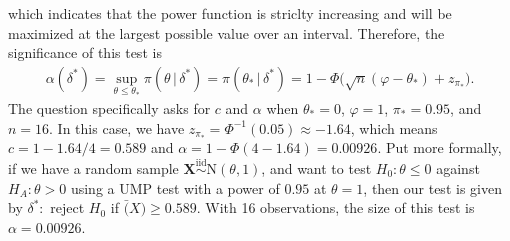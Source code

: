 \documentclass[10pt]{article}
\begin{document}
which indicates that the power function is striclty increasing and will be maximized at the largest possible value over an interval. 
Therefore, the significance of this test is 
\begin{align*}
    \alpha(\delta^*)
    = \sup_{\theta \le \theta_*} \pi(\theta \,|\, \delta^*)
    = \pi(\theta_* \,|\, \delta^*)
    = 1 - \Phi \big(  \sqrt{n}(\varphi - \theta_*) + z_{\pi_*} \big).
\end{align*}
The question specifically asks for \(c\) and \(\alpha\) when \(\theta_* = 0\), \(\varphi = 1\), \(\pi_* = 0.95\), and \(n = 16\). In this case, we have 
\(z_{\pi_*} = \Phi^{-1}(0.05) \approx -1.64\), which means \(c = 1 - 1.64 / 4 = 0.589\) and \(\alpha = 1 - \Phi(4 - 1.64) = 0.00926\). Put more formally,
if we have a random sample \(\bm{X} \overset{\mathrm{iid}}{\sim} \mathrm{N}(\theta,1)\), and want to test \(H_0 : \theta \le 0\) against \(H_A : \theta > 0\)
using a UMP test with a power of \(0.95\) at \(\theta = 1\), then our test is given by \(\delta^* :\) reject \(H_0\) if \(\bar(X) \ge 0.589\). 
With 16 observations, the size of this test is \(\alpha = 0.00926\). 
\end{document}
